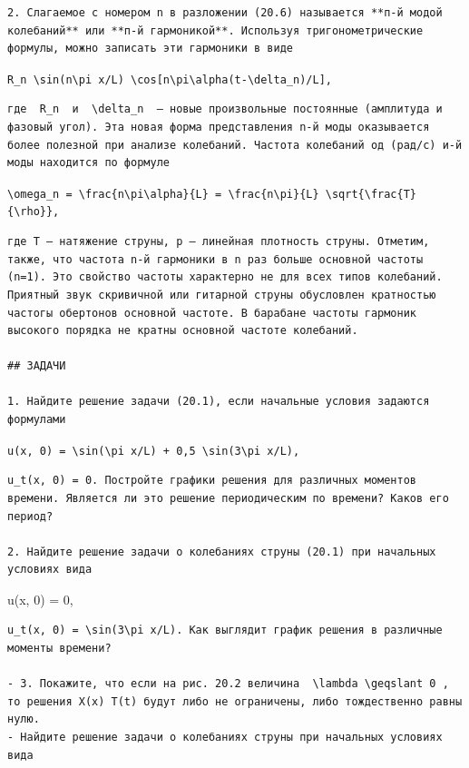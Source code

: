 \documentclass[
  ukrainian,
]{article}
\begin{document}
\begin{verbatim}
2. Слагаемое с номером n в разложении (20.6) называется **п-й модой колебаний** или **п-й гармоникой**. Используя тригонометрические формулы, можно записать эти гармоники в виде
\end{verbatim}

\texttt{R\_n\ \textbackslash{}sin(n\textbackslash{}pi\ x/L)\ \textbackslash{}cos{[}n\textbackslash{}pi\textbackslash{}alpha(t-\textbackslash{}delta\_n)/L{]},}

\begin{verbatim}
где  R_n  и  \delta_n  — новые произвольные постоянные (амплитуда и фазовый угол). Эта новая форма представления n-й моды оказывается более полезной при анализе колебаний. Частота колебаний од (рад/с) и-й моды находится по формуле
\end{verbatim}

\texttt{\textbackslash{}omega\_n\ =\ \textbackslash{}frac\{n\textbackslash{}pi\textbackslash{}alpha\}\{L\}\ =\ \textbackslash{}frac\{n\textbackslash{}pi\}\{L\}\ \textbackslash{}sqrt\{\textbackslash{}frac\{T\}\{\textbackslash{}rho\}\},}

\begin{verbatim}
где Т — натяжение струны, р — линейная плотность струны. Отметим, также, что частота n-й гармоники в n раз больше основной частоты (n=1). Это свойство частоты характерно не для всех типов колебаний. Приятный звук скривичной или гитарной струны обусловлен кратностью частогы обертонов основной частоте. В барабане частоты гармоник высокого порядка не кратны основной частоте колебаний.

## ЗАДАЧИ

1. Найдите решение задачи (20.1), если начальные условия задаются формулами
\end{verbatim}

\texttt{u(x,\ 0)\ =\ \textbackslash{}sin(\textbackslash{}pi\ x/L)\ +\ 0,5\ \textbackslash{}sin(3\textbackslash{}pi\ x/L),}

\begin{verbatim}
u_t(x, 0) = 0. Постройте графики решения для различных моментов времени. Является ли это решение периодическим по времени? Каков его период?

2. Найдите решение задачи о колебаниях струны (20.1) при начальных условиях вида
\end{verbatim}

u(x, 0) = 0,

\begin{verbatim}
u_t(x, 0) = \sin(3\pi x/L). Как выглядит график решения в различные моменты времени?

- 3. Покажите, что если на рис. 20.2 величина  \lambda \geqslant 0 , то решения X(x) T(t) будут либо не ограничены, либо тождественно равны нулю.
- Найдите решение задачи о колебаниях струны при начальных условиях вида
\end{verbatim}
\end{document}
